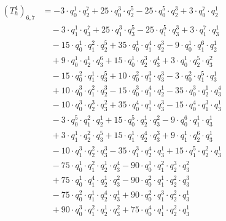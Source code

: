 \begin{align*}(T_{h}^4)_{6,7}&=-3\cdot q_0^{1}\cdot q_2^{7}+25\cdot q_0^{3}\cdot q_2^{5}-25\cdot q_0^{5}\cdot q_2^{3}+3\cdot q_0^{7}\cdot q_2^{1}\\
&\quad -3\cdot q_1^{1}\cdot q_3^{7}+25\cdot q_1^{3}\cdot q_3^{5}-25\cdot q_1^{5}\cdot q_3^{3}+3\cdot q_1^{7}\cdot q_3^{1}\\
&\quad -15\cdot q_0^{1}\cdot q_1^{2}\cdot q_2^{5}+35\cdot q_0^{1}\cdot q_1^{4}\cdot q_2^{3}-9\cdot q_0^{1}\cdot q_1^{6}\cdot q_2^{1}\\
&\quad +9\cdot q_0^{1}\cdot q_2^{1}\cdot q_3^{6}+15\cdot q_0^{1}\cdot q_2^{3}\cdot q_3^{4}+3\cdot q_0^{1}\cdot q_2^{5}\cdot q_3^{2}\\
&\quad -15\cdot q_0^{2}\cdot q_1^{1}\cdot q_3^{5}+10\cdot q_0^{2}\cdot q_1^{3}\cdot q_3^{3}-3\cdot q_0^{2}\cdot q_1^{5}\cdot q_3^{1}\\
&\quad +10\cdot q_0^{3}\cdot q_1^{2}\cdot q_2^{3}-15\cdot q_0^{3}\cdot q_1^{4}\cdot q_2^{1}-35\cdot q_0^{3}\cdot q_2^{1}\cdot q_3^{4}\\
&\quad -10\cdot q_0^{3}\cdot q_2^{3}\cdot q_3^{2}+35\cdot q_0^{4}\cdot q_1^{1}\cdot q_3^{3}-15\cdot q_0^{4}\cdot q_1^{3}\cdot q_3^{1}\\
&\quad -3\cdot q_0^{5}\cdot q_1^{2}\cdot q_2^{1}+15\cdot q_0^{5}\cdot q_2^{1}\cdot q_3^{2}-9\cdot q_0^{6}\cdot q_1^{1}\cdot q_3^{1}\\
&\quad +3\cdot q_1^{1}\cdot q_2^{2}\cdot q_3^{5}+15\cdot q_1^{1}\cdot q_2^{4}\cdot q_3^{3}+9\cdot q_1^{1}\cdot q_2^{6}\cdot q_3^{1}\\
&\quad -10\cdot q_1^{3}\cdot q_2^{2}\cdot q_3^{3}-35\cdot q_1^{3}\cdot q_2^{4}\cdot q_3^{1}+15\cdot q_1^{5}\cdot q_2^{2}\cdot q_3^{1}\\
&\quad -75\cdot q_0^{1}\cdot q_1^{2}\cdot q_2^{1}\cdot q_3^{4}-90\cdot q_0^{1}\cdot q_1^{2}\cdot q_2^{3}\cdot q_3^{2}\\
&\quad +75\cdot q_0^{1}\cdot q_1^{4}\cdot q_2^{1}\cdot q_3^{2}-90\cdot q_0^{2}\cdot q_1^{1}\cdot q_2^{2}\cdot q_3^{3}\\
&\quad -75\cdot q_0^{2}\cdot q_1^{1}\cdot q_2^{4}\cdot q_3^{1}+90\cdot q_0^{2}\cdot q_1^{3}\cdot q_2^{2}\cdot q_3^{1}\\
&\quad +90\cdot q_0^{3}\cdot q_1^{2}\cdot q_2^{1}\cdot q_3^{2}+75\cdot q_0^{4}\cdot q_1^{1}\cdot q_2^{2}\cdot q_3^{1}\end{align*}

